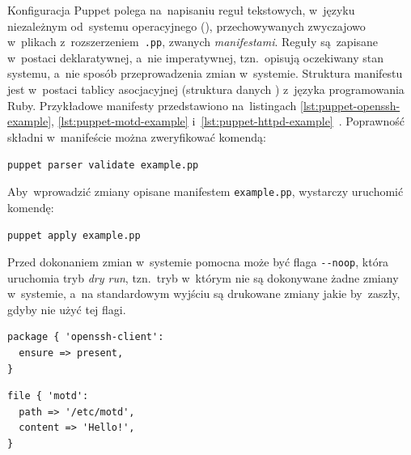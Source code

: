 \documentclass[thesis]{subfiles}
\begin{document}
Konfiguracja Puppet polega na~napisaniu reguł tekstowych, w~języku niezależnym od~systemu operacyjnego (), przechowywanych zwyczajowo w~plikach z~rozszerzeniem~\texttt{.pp}, zwanych \emph{manifestami}. Reguły są~zapisane w~postaci deklaratywnej, a~nie imperatywnej, tzn.~opisują oczekiwany stan systemu, a~nie sposób przeprowadzenia zmian w~systemie. Struktura manifestu jest w~postaci tablicy asocjacyjnej (struktura danych ) z~języka programowania Ruby. Przykładowe manifesty przedstawiono na~listingach \ref{lst:puppet-openssh-example}, \ref{lst:puppet-motd-example} i~\ref{lst:puppet-httpd-example}~\cite{puppet-examples}. Poprawność składni w~manifeście  można zweryfikować komendą:
\begin{center}
	\texttt{puppet parser validate example.pp}
\end{center}

Aby~wprowadzić zmiany opisane manifestem \texttt{example.pp}, wystarczy uruchomić komendę:
\begin{center}
	\texttt{puppet apply example.pp}
\end{center}

Przed dokonaniem zmian w~systemie pomocna może być flaga \texttt{-{}-noop}, która uruchomia tryb \emph{dry run}, tzn.~tryb w~którym nie są dokonywane żadne zmiany w~systemie, a~na standardowym wyjściu są drukowane zmiany jakie by~zaszły, gdyby nie użyć tej flagi.

\begin{minipage}{\linewidth} %
\begin{lstlisting}[numbers=none,caption={Manifest Puppet gwarantujący, że~pakiet \texttt{openssh-client}, dostarczający klienta SSH, jest zainstalowany},label=lst:puppet-openssh-example]
package { 'openssh-client':
  ensure => present,
}
\end{lstlisting}
\end{minipage}

\begin{lstlisting}[numbers=none,caption={Manifest Puppet gwarantujący istnienie pliku \hreftt{https://en.wikipedia.org/wiki/Motd_(Unix)}{/etc/motd} z~komunikatem \texttt{Hello!}, który wyświetla się~użytkownikom systemu po~zalogowaniu},label=lst:puppet-motd-example]
file { 'motd':
  path => '/etc/motd',
  content => 'Hello!',
}
\end{lstlisting}
\end{document}
